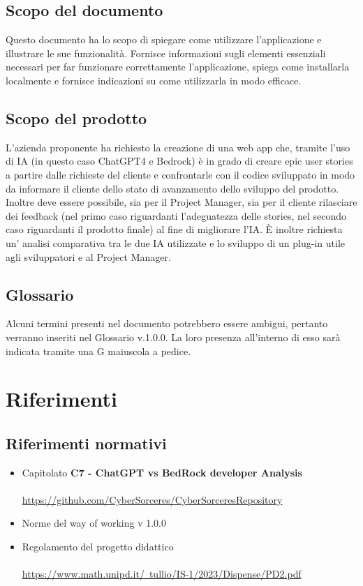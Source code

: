 \documentclass{article}
\begin{document}
\subsection{Scopo del documento}
Questo documento ha lo scopo di spiegare come utilizzare l'applicazione e illustrare le sue funzionalità. Fornisce informazioni sugli elementi essenziali necessari per far funzionare correttamente l'applicazione, spiega come installarla localmente e fornisce indicazioni su come utilizzarla in modo efficace.
\subsection{Scopo del prodotto}
L'azienda proponente ha richiesto la creazione di una web app che, tramite l'uso di IA (in questo caso ChatGPT4 e Bedrock) è in grado di creare epic user stories a partire dalle richieste del cliente e confrontarle con il codice sviluppato in modo da informare il cliente dello stato di avanzamento dello sviluppo del prodotto. Inoltre deve essere possibile, sia per il Project Manager, sia per il cliente rilasciare dei feedback (nel primo caso riguardanti l'adeguatezza delle stories, nel secondo caso riguardanti il prodotto finale) al fine di migliorare l'IA. È inoltre richiesta un' analisi comparativa tra le due IA utilizzate e lo sviluppo di un plug-in utile agli sviluppatori e al Project Manager.

\subsection{Glossario}
Alcuni termini presenti nel documento potrebbero essere ambigui, pertanto verranno inseriti nel Glossario v.1.0.0. La loro presenza all'interno di esso sarà indicata tramite una G maiuscola a pedice.

\section{Riferimenti}
\subsection{Riferimenti normativi}
\begin{itemize}
    \item Capitolato \textbf{C7 - ChatGPT vs BedRock developer Analysis}
    \\ \\
       \href{https://github.com/CyberSorceres/CyberSorceresRepository}{https://github.com/CyberSorceres/CyberSorceresRepository} 
    \item Norme del way of working v 1.0.0
    \item Regolamento del progetto didattico \\ \\ \href{https://www.math.unipd.it/~tullio/IS-1/2023/Dispense/PD2.pdf} 
    {https://www.math.unipd.it/~tullio/IS-1/2023/Dispense/PD2.pdf}
\end{itemize}
\end{document}
